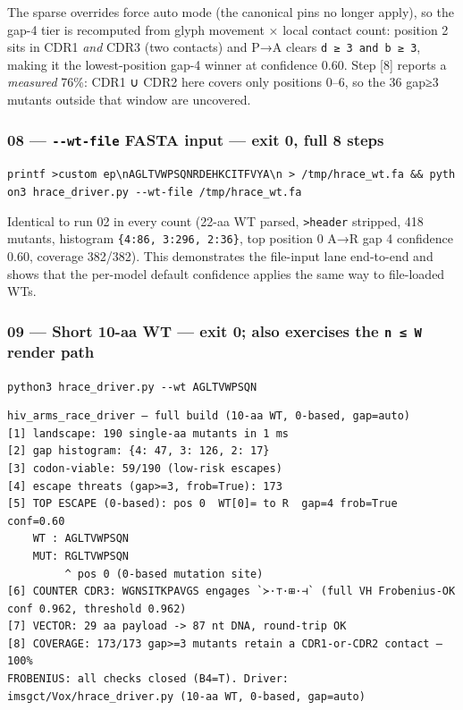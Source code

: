 \documentclass[12pt,a4paper]{article}
\begin{document}
The sparse overrides force auto mode (the canonical pins no longer
apply), so the gap-4 tier is recomputed from glyph movement × local
contact count: position 2 sits in CDR1 \emph{and} CDR3 (two contacts)
and P→A clears \texttt{d\ ≥\ 3\ and\ b\ ≥\ 3}, making it the
lowest-position gap-4 winner at confidence 0.60. Step {[}8{]} reports a
\emph{measured} 76\%: CDR1 ∪ CDR2 here covers only positions 0--6, so
the 36 gap≥3 mutants outside that window are uncovered.

\hypertarget{wt-file-fasta-input-exit-0-full-8-steps}{%
\subsubsection{\texorpdfstring{08 --- \texttt{-\/-wt-file} FASTA input
--- exit 0, full 8
steps}{08 --- -\/-wt-file FASTA input --- exit 0, full 8 steps}}\label{wt-file-fasta-input-exit-0-full-8-steps}}

\texttt{printf\ \textquotesingle{}\textgreater{}custom\ ep\textbackslash{}nAGLTVWPSQNRDEHKCITFVYA\textbackslash{}n\textquotesingle{}\ \textgreater{}\ /tmp/hrace\_wt.fa\ \&\&\ python3\ hrace\_driver.py\ -\/-wt-file\ /tmp/hrace\_wt.fa}

Identical to run 02 in every count (22-aa WT parsed,
\texttt{\textgreater{}header} stripped, 418 mutants, histogram
\texttt{\{4:86,\ 3:296,\ 2:36\}}, top position 0 A→R gap 4 confidence
0.60, coverage 382/382). This demonstrates the file-input lane
end-to-end and shows that the per-model default confidence applies the
same way to file-loaded WTs.

\hypertarget{short-10-aa-wt-exit-0-also-exercises-the-n-w-render-path}{%
\subsubsection{\texorpdfstring{09 --- Short 10-aa WT --- exit 0; also
exercises the \texttt{n\ ≤\ W} render
path}{09 --- Short 10-aa WT --- exit 0; also exercises the n ≤ W render path}}\label{short-10-aa-wt-exit-0-also-exercises-the-n-w-render-path}}

\texttt{python3\ hrace\_driver.py\ -\/-wt\ AGLTVWPSQN}

\begin{verbatim}
hiv_arms_race_driver — full build (10-aa WT, 0-based, gap=auto)
[1] landscape: 190 single-aa mutants in 1 ms
[2] gap histogram: {4: 47, 3: 126, 2: 17}
[3] codon-viable: 59/190 (low-risk escapes)
[4] escape threats (gap>=3, frob=True): 173
[5] TOP ESCAPE (0-based): pos 0  WT[0]= to R  gap=4 frob=True conf=0.60
    WT : AGLTVWPSQN
    MUT: RGLTVWPSQN
         ^ pos 0 (0-based mutation site)
[6] COUNTER CDR3: WGNSITKPAVGS engages `≻·⊤·⊞·⊣` (full VH Frobenius-OK conf 0.962, threshold 0.962)
[7] VECTOR: 29 aa payload -> 87 nt DNA, round-trip OK
[8] COVERAGE: 173/173 gap>=3 mutants retain a CDR1-or-CDR2 contact — 100%
FROBENIUS: all checks closed (B4=T). Driver: imsgct/Vox/hrace_driver.py (10-aa WT, 0-based, gap=auto)
\end{verbatim}
\end{document}

